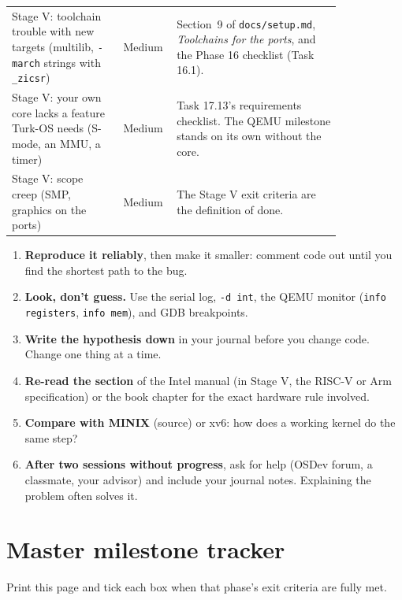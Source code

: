 \documentclass[11pt,a4paper]{article}
\begin{document}
\begin{center}
\begin{longtable}{@{}>{\raggedright\arraybackslash}p{0.33\linewidth} c >{\raggedright\arraybackslash}p{0.5\linewidth}@{}}
Stage V: toolchain trouble with new targets (multilib, \texttt{-march} strings with \texttt{\_zicsr}) & Medium & Section~9 of \texttt{docs/setup.md}, \emph{Toolchains for the ports}, and the Phase 16 checklist (Task 16.1). \\
Stage V: your own core lacks a feature Turk-OS needs (S-mode, an MMU, a timer) & Medium & Task 17.13's requirements checklist. The QEMU milestone stands on its own without the core. \\
Stage V: scope creep (SMP, graphics on the ports) & Medium & The Stage V exit criteria are the definition of done. \\
\end{longtable}
\end{center}

\begin{tipbox}
\begin{enumerate}
  \item \textbf{Reproduce it reliably}, then make it smaller: comment code out until you find the shortest path to the bug.
  \item \textbf{Look, don't guess.} Use the serial log, \texttt{-d int}, the QEMU monitor (\texttt{info registers}, \texttt{info mem}), and GDB breakpoints.
  \item \textbf{Write the hypothesis down} in your journal before you change code. Change one thing at a time.
  \item \textbf{Re-read the section} of the Intel manual (in Stage V, the RISC-V or Arm specification) or the book chapter for the exact hardware rule involved.
  \item \textbf{Compare with MINIX} (\OSDI source) or xv6: how does a working kernel do the same step?
  \item \textbf{After two sessions without progress}, ask for help (OSDev forum, a classmate, your advisor) and include your journal notes. Explaining the problem often solves it.
\end{enumerate}
\end{tipbox}

\section{Master milestone tracker}

Print this page and tick each box when that phase's exit criteria are fully met.
\end{document}
